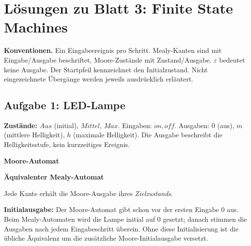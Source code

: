 \newcommand{\printpraesenzlsg}{false}
\newcommand{\printloesungen}{true}
\newcommand{\printbewertungen}{false}
\newcommand{\blattnummer}{3}

\usetikzlibrary{automata,arrows.meta,positioning}
\newcommand{\leer}{\ensuremath{\varepsilon}}

\section*{Lösungen zu Blatt 3: Finite State Machines}
\textbf{Konventionen.} Ein Eingabeereignis pro Schritt. Mealy-Kanten sind mit Eingabe/Ausgabe beschriftet, Moore-Zustände mit Zustand/Ausgabe. $\varepsilon$ bedeutet keine Ausgabe. Der Startpfeil kennzeichnet den Initialzustand. Nicht eingezeichnete Übergänge werden jeweils ausdrücklich erläutert.

\subsection*{Aufgabe 1: LED-Lampe}
\textbf{Zustände:} $Aus$ (initial), $Mittel$, $Max$. Eingaben: $on,off$. Ausgaben: $0$ (aus), $m$ (mittlere Helligkeit), $h$ (maximale Helligkeit). Die Ausgabe beschreibt die Helligkeitsstufe, kein kurzzeitiges Ereignis.

\textbf{Moore-Automat}
\begin{center}
\end{center}

\textbf{Äquivalenter Mealy-Automat}\par
Jede Kante erhält die Moore-Ausgabe ihres \emph{Zielzustands}.
\begin{center}
\end{center}
\textbf{Initialausgabe:} Der Moore-Automat gibt schon vor der ersten Eingabe $0$ aus. Beim Mealy-Automaten wird die Lampe initial auf $0$ gesetzt; danach stimmen die Ausgaben nach jedem Eingabeschritt überein. Ohne diese Initialisierung ist die übliche Äquivalenz um die zusätzliche Moore-Initialausgabe versetzt.

